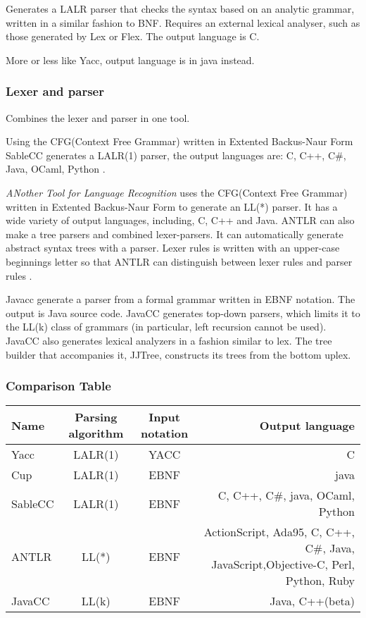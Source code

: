 Generates a LALR parser that checks the syntax based on an analytic grammar, written in a similar fashion to BNF. Requires an external lexical analyser, such as those generated by Lex or Flex. The output language is C. \citep{Yacc}

More or less like Yacc, output language is in java instead. \citep{CUP}

\subsubsection{Lexer and parser}
Combines the lexer and parser in one tool.

Using the CFG(Context Free Grammar) written in Extented Backus-Naur Form SableCC generates a LALR(1) parser, the output languages are: C, C++, C\#, Java, OCaml, Python \citep{SableCC}.

\textit{ANother Tool for Language Recognition} uses the CFG(Context Free Grammar) written in Extented Backus-Naur Form to generate an LL(*) parser. It has a wide variety of output languages, including, C, C++ and Java.
ANTLR can also make a tree parsers and combined lexer-parsers. It can automatically generate abstract syntax trees with a parser\citep{ANTLR}.
Lexer rules is written with an upper-case beginnings letter so that ANTLR can distinguish between lexer rules and parser rules \citep{ANTLRLexer}. 


Javacc generate a parser from a formal grammar written in EBNF notation. The output is Java source code. JavaCC generates top-down parsers, which limits it to the LL(k) class of grammars (in particular, left recursion cannot be used). JavaCC also generates lexical analyzers in a fashion similar to lex\citep{Javacc}. The tree builder that accompanies it, JJTree, constructs its trees from the bottom uplex\citep{JJTree}.


\subsubsection{Comparison Table}
\begin{table}[H]
\begin{tabularx}{\textwidth}{|l|c|c|R|}
\hline
\textbf{Name} 	& \textbf{Parsing algorithm} 	& \textbf{Input notation} 	& \textbf{Output language}			\\ \hline
Yacc 			& LALR(1) 						& YACC 						& C									\\ \hline
Cup 			& LALR(1) 						& EBNF 						& java								\\ \hline
SableCC 		& LALR(1) 						& EBNF 						& C, C++, C\#, java, OCaml, Python	\\ \hline
ANTLR 			& LL(*) 						& EBNF 						& ActionScript, Ada95, C, C++, C\#, Java, JavaScript,Objective-C, Perl, Python, Ruby	\\ \hline
JavaCC 			& LL(k) 						& EBNF 						& Java, C++(beta)					\\ \hline
\end{tabularx}
\end{table}

